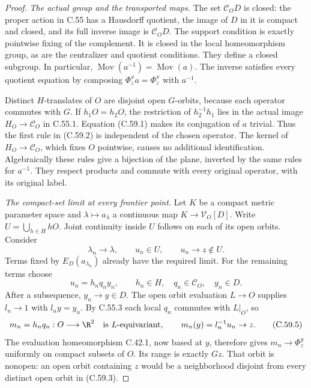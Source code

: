 \begin{proof}
\emph{The actual group and the transported maps.}
The set $\mathcal C_OD$ is closed: the proper action
in C.55 has a Hausdorff quotient, the image of $D$
in it is compact and closed, and its full inverse
image is $\mathcal C_OD$.
The support condition is exactly pointwise fixing of
the complement. It is closed in the local homeomorphism
group, as are the centralizer and quotient conditions.
They define a closed subgroup. In particular,
$\operatorname{Mov}(a^{-1})=\operatorname{Mov}(a)$.
The inverse satisfies every quotient equation by
composing $\Phi_z^x a=\Phi_z^x$ with $a^{-1}$.

Distinct $H$-translates of $O$ are disjoint open
$G$-orbits, because each operator commutes with $G$.
If $h_1O=h_2O$, the restriction of $h_2^{-1}h_1$
lies in the actual image
$H_O\to\mathcal C_O$ in C.55.1. Equation (C.59.1)
makes its conjugation of $a$ trivial.
Thus the first rule in (C.59.2) is independent of
the chosen operator. The kernel of $H_O\to\mathcal C_O$,
which fixes $O$ pointwise, causes no additional
identification. Algebraically these rules give a
bijection of the plane, inverted by the same rules
for $a^{-1}$. They respect products and commute with
every original operator, with its original label.

\emph{The compact-set limit at every frontier point.}
Let $K$ be a compact metric parameter space and
$\lambda\mapsto a_\lambda$ a continuous map
$K\to\mathcal V_O[D]$. Write $U=\bigcup_{h\in H}hO$.
Joint continuity inside $U$ follows on each of its
open orbits. Consider
\[
 \lambda_n\to\lambda,\qquad
       u_n\in U,\qquad u_n\to z\notin U.                \tag{C.59.3}
\]
Terms fixed by $E_D(a_{\lambda_n})$ already have the
required limit. For the remaining terms choose
\[
 u_n=h_nq_n y_n,\qquad h_n\in H,\quad
             q_n\in\mathcal C_O,\quad y_n\in D .
                                                               \tag{C.59.4}
\]
After a subsequence, $y_n\to y\in D$.
The open orbit evaluation $L\to O$ supplies
$l_n\to1$ with $l_ny=y_n$.
By C.55.3 each local $q_n$ commutes with $L|_O$,
so
\[
 m_n=h_nq_n:O\longrightarrow\R^2
 \quad\hbox{is $L$-equivariant},\qquad
                     m_n(y)=l_n^{-1}u_n\to z.          \tag{C.59.5}
\]
The evaluation homeomorphism C.42.1, now based at $y$,
therefore gives
$m_n\to\Phi_z^y$ uniformly on compact subsets of $O$.
Its range is exactly $Gz$.
That orbit is nonopen: an open orbit containing $z$
would be a neighborhood disjoint from every distinct
open orbit in (C.59.3).


\end{proof}
